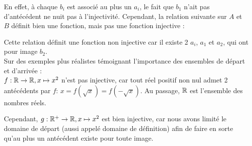 \noindent En effet, à chaque $b_i$ est associé au plus un $a_i$, le fait que $b_1$ n'ait pas d'antécédent ne nuit pas à l'injectivité. Cependant, la relation suivante sur $A$ et $B$ définit bien une fonction, mais pas une fonction injective :

\begin{center}
\end{center}
Cette relation définit une fonction non injective car il existe 2 $a_i$, $a_1$ et $a_2$, qui ont pour image $b_2$.\\

\noindent Sur des exemples plus réalistes témoignant l'importance des ensembles de départ et d'arrivée :\\
$f: \mathbb{R} \to \mathbb{R}, x \mapsto x^2$ n'est pas injective, car tout réel positif non nul admet 2 antécédents par $f$: $x = f(\sqrt{x}) = f(-\sqrt{x})$. Au passage, $\mathbb{R}$ est l'ensemble des nombres réels.
\begin{center}
\end{center}

\noindent Cependant, $g: \mathbb{R}^+ \to \mathbb{R}, x \mapsto x^2$ est bien injective, car nous avons limité le domaine de départ (aussi appelé domaine de définition) afin de faire en sorte qu'au plus un antécédent existe pour toute image.

\begin{center}
\end{center}

